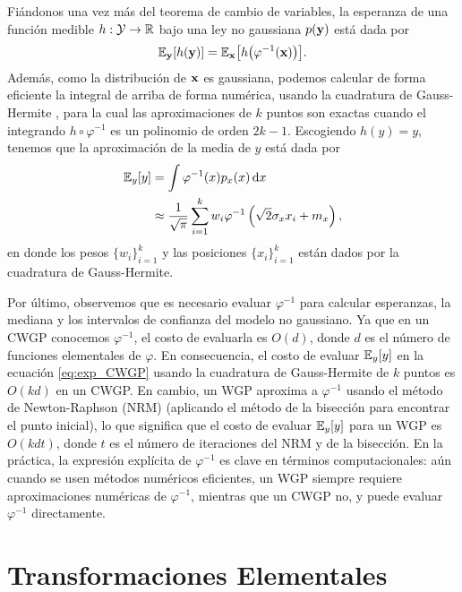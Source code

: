 Fiándonos una vez más del teorema de cambio de variables, la esperanza de una función medible \(h : \mathcal{Y} \to \mathbb{R}\) bajo una ley no gaussiana \(p(\mathbf{y})\) está dada por
\begin{align*}
	\mathbb{E}_{\mathbf{y}}[h(\mathbf{y})] = \mathbb{E}_{\mathbf{x}} \bigl[h\bigl(\varphi^{-1}(\mathbf{x})\bigr)\bigr].
\end{align*}
Además, como la distribución de \(\mathbf{x}\) es gaussiana, podemos calcular de forma eficiente la integral de arriba de forma numérica, usando la cuadratura de Gauss-Hermite \cite{gausshermite64}, para la cual las aproximaciones de \(k\) puntos son exactas cuando el integrando \(h \circ \varphi^{-1}\) es un polinomio de orden \(2k-1\). Escogiendo \(h(y)=y\), tenemos que la aproximación de la media de \(y\) está dada por
\begin{align}
	\label{eq:exp_CWGP}
	\mathbb{E}_{y}[y]	&= \int \varphi^{-1}(x) p_{x}(x) \dd{x} \nonumber\\
					&\approx \frac{1}{\sqrt{\pi}} \sum_{i=1}^{k} w_{i} \varphi^{-1}\left(\sqrt{2}\sigma_{x} x_{i} + m_{x} \right),
\end{align}
en donde los pesos \(\{w_{i}\}_{i=1}^k\) y las posiciones \(\{x_{i}\}_{i=1}^k\) están dados por la cuadratura de Gauss-Hermite\cite{gausshermite64}. 

Por último, observemos que es necesario evaluar \(\varphi^{-1}\) para calcular esperanzas, la mediana y los intervalos de confianza del modelo no gaussiano. Ya que en un CWGP conocemos \(\varphi^{-1}\), el costo de evaluarla es \(O(d)\), donde \(d\) es el número de funciones elementales de \(\varphi\). En consecuencia, el costo de evaluar \(\mathbb{E}_{y}[y]\) en la ecuación \eqref{eq:exp_CWGP} usando la cuadratura de Gauss-Hermite de \(k\) puntos es \(O(kd)\) en un CWGP. En cambio, un WGP aproxima a \(\varphi^{-1}\) usando el método de Newton-Raphson (NRM) \cite{atkinson2008introduction} (aplicando el método de la bisección para encontrar el punto inicial), lo que significa que el costo de evaluar \(\mathbb{E}_{y}[y]\) para un WGP es \(O(kdt)\), donde \(t\) es el número de iteraciones del NRM y de la bisección. En la práctica, la expresión explícita de \(\varphi^{-1}\) es clave en términos computacionales: aún cuando se usen métodos numéricos eficientes, un WGP siempre requiere aproximaciones numéricas de \(\varphi^{-1}\), mientras que un CWGP no, y puede evaluar \(\varphi^{-1}\) directamente.

\section{Transformaciones Elementales}
\label{sec:transformations}

